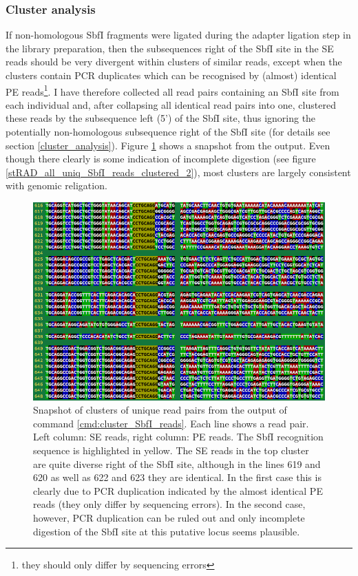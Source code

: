\documentclass[a4paper,12pt,times,print,index,custombib,custommargin]{PhDThesisPSnPDF}\usepackage[]{graphicx}\usepackage[]{color}
\begin{document}
\subsubsection{Cluster analysis}

If non-homologous SbfI fragments were ligated during the adapter ligation step in the library preparation, then the subsequences right of the SbfI site in the SE reads should be very divergent within clusters of similar reads, except when the clusters contain PCR duplicates which can be recognised by (almost) identical PE reads\footnote{they should only differ by sequencing errors}. I have therefore collected all read pairs containing an SbfI site from each individual and, after collapsing all identical read pairs into one, clustered these reads by the subsequence left (5') of the SbfI site, thus ignoring the potentially non-homologous subsequence right of the SbfI site (for details see section \ref{cluster_analysis}). Figure \ref{stRAD_all_uniq_SbfI_reads_clustered_1} shows a snapshot from the output.  Even though there clearly is some indication of incomplete digestion (see figure \ref{stRAD_all_uniq_SbfI_reads_clustered_2}), most clusters are largely consistent with genomic religation.
%
\begin{figure}
\centering
\includegraphics[width=.95\textwidth]{stRAD_all_uniq_SbfI_reads_clustered_1}
\caption{Snapshot of clusters of unique read pairs from the output of command \ref{cmd:cluster_SbfI_reads}. Each line shows a read pair. Left column: SE reads, right column: PE reads. The SbfI recognition sequence is highlighted in yellow. The SE reads in the top cluster are quite diverse right of the SbfI site, although in the lines 619 and 620 as well as 622 and 623 they are identical. In the first case this is clearly due to PCR duplication indicated by the almost identical PE reads (they only differ by sequencing errors). In the second case, however, PCR duplication can be ruled out and only incomplete digestion of the SbfI site at this putative locus seems plausible.}
\label{stRAD_all_uniq_SbfI_reads_clustered_1}
\end{figure}
\end{document}
